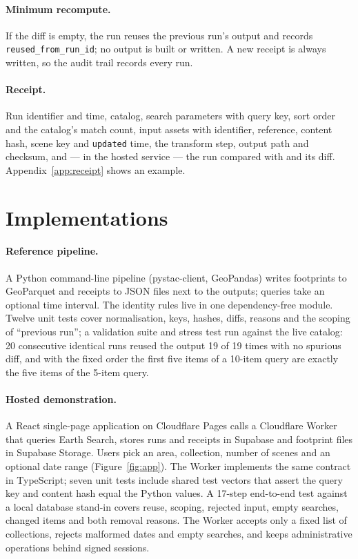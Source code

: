 \documentclass[11pt,a4paper]{article}
\begin{document}
\paragraph{Minimum recompute.} If the diff is empty, the run reuses the previous run's output and records \texttt{reused\_from\_run\_id}; no output is built or written. A new receipt is always written, so the audit trail records every run.

\paragraph{Receipt.} Run identifier and time, catalog, search parameters with query key, sort order and the catalog's match count, input assets with identifier, reference, content hash, scene key and \texttt{updated} time, the transform step, output path and checksum, and --- in the hosted service --- the run compared with and its diff. Appendix~\ref{app:receipt} shows an example.

\section{Implementations}
\label{sec:impl}

\paragraph{Reference pipeline.} A Python command-line pipeline (pystac-client, GeoPandas) writes footprints to GeoParquet and receipts to JSON files next to the outputs; queries take an optional time interval. The identity rules live in one dependency-free module. Twelve unit tests cover normalisation, keys, hashes, diffs, reasons and the scoping of ``previous run''; a validation suite and stress test run against the live catalog: 20 consecutive identical runs reused the output 19 of 19 times with no spurious diff, and with the fixed order the first five items of a 10-item query are exactly the five items of the 5-item query.

\paragraph{Hosted demonstration.} A React single-page application on Cloudflare Pages calls a Cloudflare Worker that queries Earth Search, stores runs and receipts in Supabase and footprint files in Supabase Storage. Users pick an area, collection, number of scenes and an optional date range (Figure~\ref{fig:app}). The Worker implements the same contract in TypeScript; seven unit tests include shared test vectors that assert the query key and content hash equal the Python values. A 17-step end-to-end test against a local database stand-in covers reuse, scoping, rejected input, empty searches, changed items and both removal reasons. The Worker accepts only a fixed list of collections, rejects malformed dates and empty searches, and keeps administrative operations behind signed sessions.
\end{document}
